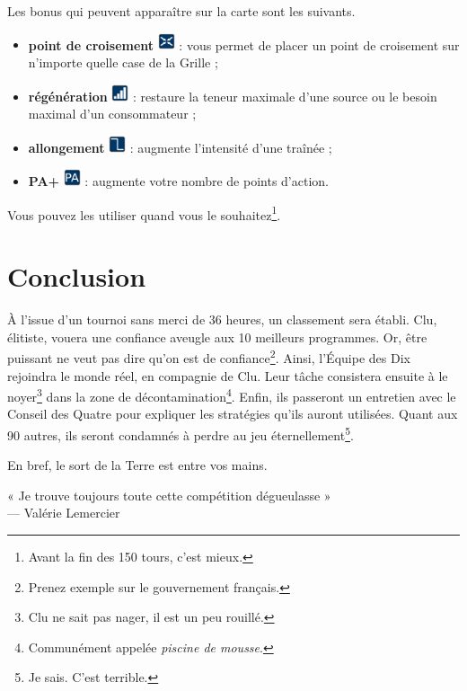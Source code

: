 Les bonus qui peuvent apparaître sur la carte sont les suivants.
\begin{itemize}
\item \textbf{point de croisement} \includegraphics[width=5mm]{../data/graphics/bonus-bonus_croisement.png} : vous permet de placer un point de croisement sur n'importe quelle case de la Grille ;
\item \textbf{régénération} \includegraphics[width=5mm]{../data/graphics/bonus-bonus_regeneration.png} : restaure la teneur maximale d'une source ou le besoin maximal d'un consommateur ;
\item \textbf{allongement} \includegraphics[width=5mm]{../data/graphics/bonus-plus_long.png} : augmente l'intensité d'une traînée ;
\item \textbf{PA+} \includegraphics[width=5mm]{../data/graphics/bonus-plus_pa.png} : augmente votre nombre de points d'action.
\end{itemize}\bigskip

Vous pouvez les utiliser quand vous le souhaitez\footnote{Avant la fin des 150 tours, c'est mieux.}.

\section{Conclusion}


À l'issue d'un tournoi sans merci de 36 heures, un classement sera établi. Clu, élitiste, vouera une confiance aveugle aux 10 meilleurs programmes. Or, être puissant ne veut pas dire qu'on est de confiance\footnote{Prenez exemple sur le gouvernement français.}. Ainsi, l'Équipe des Dix rejoindra le monde réel, en compagnie de Clu. Leur tâche consistera ensuite à le noyer\footnote{Clu ne sait pas nager, il est un peu rouillé.} dans la zone de décontamination\footnote{Communément appelée \emph{piscine de mousse}.}. Enfin, ils passeront un entretien avec le Conseil des Quatre pour expliquer les stratégies qu'ils auront utilisées. Quant aux 90 autres, ils seront condamnés à perdre au jeu éternellement\footnote{Je sais. C'est terrible.}.

En bref, le sort de la Terre est entre vos mains.

\vspace{5cm}

\noindent
« Je trouve toujours toute cette compétition dégueulasse »\\
— Valérie Lemercier